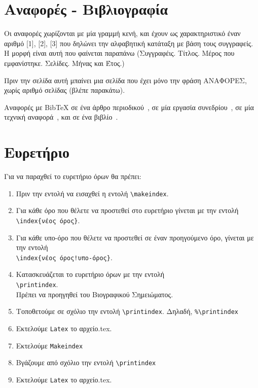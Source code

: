 \section{Αναφορές - Βιβλιογραφία}
\label{sec:2.8}

Οι αναφορές χωρίζονται με μία γραμμή κενή, και έχουν ως
χαρακτηριστικό έναν αριθμό [1], [2], [3] που δηλώνει την
αλφαβητική κατάταξη με βάση τους συγγραφείς. Η μορφή είναι αυτή
που φαίνεται παραπάνω (Συγγραφέις. Τίτλος. Μέρος που εμφανίστηκε.
Σελίδες. Μήνας και Έτος.)

Πριν την σελίδα αυτή μπαίνει μια σελίδα που έχει μόνο την φράση
ΑΝΑΦΟΡΕΣ, χωρίς αριθμό σελίδας (βλέπε παρακάτω).

Αναφορές με BibTeX σε ένα άρθρο περιοδικού~\cite{Newman2003a}, σε μία εργασία συνεδρίου~\cite{DeCandia2007a}, σε μία τεχνική αναφορά~\cite{Jain1984a}, και σε ένα βιβλίο~\cite{Golumbic2004a}.


\section{Ευρετήριο}
\label{sec:2.9}

Για να παραχθεί το ευρετήριο όρων θα πρέπει:

\begin{enumerate}
  \item Πριν την εντολή \s \verb""\s να εισαχθεί η
  εντολή \s\s \verb"\makeindex".
  \item Για κάθε όρο που θέλετε να προστεθεί στο ευρετήριο γίνεται
  με την εντολή \\ \s\s \verb"\index{νέος όρος}".
  \item Για κάθε υπο-όρο που θέλετε να προστεθεί σε έναν προηγούμενο όρο, γίνεται
  με την εντολή\\ \s\s \verb"\index{νέος όρος!υπο-όρος}".
  \item Κατασκευάζεται το ευρετήριο όρων με την εντολή\\ \s\s
  \verb"\printindex". \\Πρέπει να προηγηθεί του Βιογραφικού
  Σημειώματος.
  \item Τοποθετούμε σε σχόλιο την εντολή \s\s
  \verb"\printindex". Δηλαδή, \s\s
  \verb"%\printindex"
  \item Εκτελούμε \s\s
  \verb"Latex" \s\s το αρχείο.tex.
  \item Εκτελούμε \s\s
  \verb"Makeindex"
  \item Βγάζουμε από σχόλιο την εντολή \s\s
  \verb"\printindex"
  \item Εκτελούμε \s\s
  \verb"Latex" \s\s το αρχείο.tex.
\end{enumerate}






